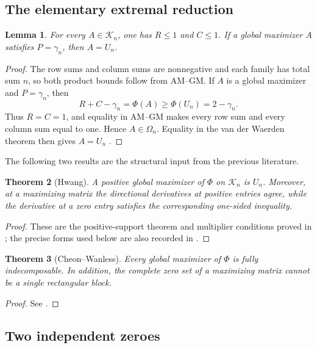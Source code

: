 \documentclass[10pt,a4paper]{amsart}
\newtheorem{theorem}{Theorem}[section]
\newtheorem{lemma}[theorem]{Lemma}
\theoremstyle{definition}
\theoremstyle{remark}
\begin{document}
\subsection{The elementary extremal reduction}

\begin{lemma}\label{lem:amgm-vdw}
For every \(A\in\mathcal K_n\), one has \(R\leq1\) and \(C\leq1\).
If a global maximizer \(A\) satisfies \(P=\gamma_n\), then \(A=U_n\).
\end{lemma}

\begin{proof}
The row sums and column sums are nonnegative and each family has total
sum \(n\), so both product bounds follow from AM--GM.  If \(A\) is a
global maximizer and \(P=\gamma_n\), then
\[
 R+C-\gamma_n=\Phi(A)\geq\Phi(U_n)=2-\gamma_n.
\]
Thus \(R=C=1\), and equality in AM--GM makes every row sum and every
column sum equal to one.  Hence \(A\in\Omega_n\).  Equality in the van der
Waerden theorem then gives \(A=U_n\) \cite{Egorychev}.
\end{proof}

The following two results are the structural input from the previous
literature.

\begin{theorem}[Hwang]\label{thm:hwang-positive}
A positive global maximizer of \(\Phi\) on \(\mathcal K_n\) is \(U_n\).
Moreover, at a maximizing matrix the directional derivatives at positive
entries agree, while the derivative at a zero entry satisfies the
corresponding one-sided inequality.
\end{theorem}

\begin{proof}
These are the positive-support theorem and multiplier conditions proved in
\cite{HwangDittert,Hwang87}; the precise forms used below are also recorded
in \cite[Lemmas~3.5--3.6]{CW}.
\end{proof}

\begin{theorem}[Cheon--Wanless]\label{thm:cw-boundary}
Every global maximizer of \(\Phi\) is fully indecomposable.  In addition,
the complete zero set of a maximizing matrix cannot be a single
rectangular block.
\end{theorem}

\begin{proof}
See \cite[Theorems~3.2 and~3.7]{CW}.
\end{proof}

\subsection{Two independent zeroes}
\end{document}
